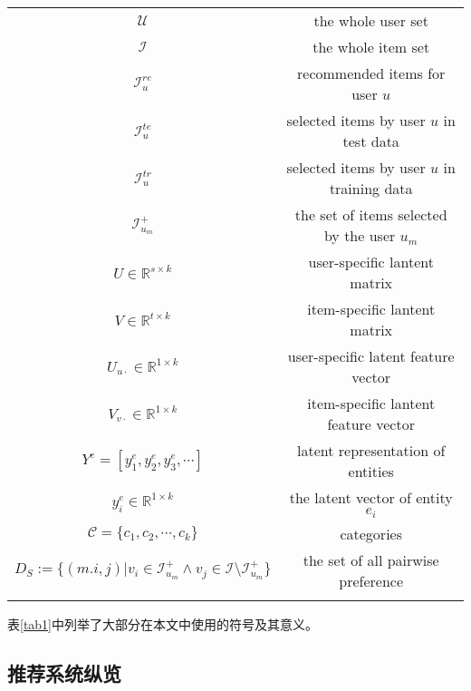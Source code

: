 \begin{table}[htbp]
\begin{center}
\begin{tabular}{cc}
			$\mathcal{U}$               & the whole user set\\
			$\mathcal{I}$               & the whole item set \\
			$\mathcal{I}_u^{re}$        & recommended items for user $u$\\
			$\mathcal{I}_u^{te}$        & selected items by user $u$ in test data\\
			$\mathcal{I}_u^{tr}$        & selected items by user $u$ in training data\\
			$\mathcal{I}_{u_m}^+$       & the set of items selected by the user $u_m$ \\
			$U \in \mathbb{R}^{s \times k } $             & user-specific lantent matrix \\
			$V \in \mathbb{R}^{t \times k } $             & item-specific lantent matrix \\
			$U_{u \cdot } \in \mathbb{R}^{1 \times k } $  & 
			user-specific latent feature vector \\
			$V_{v \cdot } \in \mathbb{R}^{1\times k}$     &
			item-specific lantent feature vector\\
			$Y^e = \left[y_1^e,y_2^e,y_3^e,\cdots\right]$ & latent representation of entities \\
			$y_i^e \in \mathbb{R}^{1\times k}$            & 
			the latent vector of entity $e_i$ \\
		    $\mathcal{C} = \{c_1,c_2,\cdots,c_k\}$        & categories\\
			$D_S := \{\left(m.i,j\right) | v_i \in \mathcal{I}_{u_m}^+ \wedge v_j \in \mathcal{I} \setminus \mathcal{I}_{u_m}^+\}$                        &  
			the set of all pairwise preference\\
			\Xhline{1.2pt}
			
		\end{tabular}
	\end{center}
\end{table}
表\ref{tab1}中列举了大部分在本文中使用的符号及其意义。




\subsection{推荐系统纵览}


